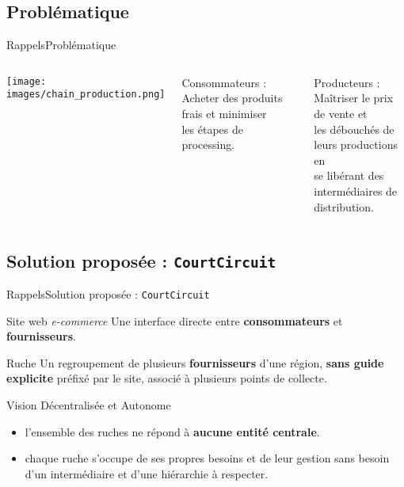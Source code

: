 \documentclass[usenames,dvipsnames]{beamer}
\begin{document}
\subsection{Problématique}
\begin{frame}{Rappels}{Problématique}
\begin{columns}[onlytextwidth, T]
  \column{50mm}
    \texttt{[image: images/chain\_production.png]}

  \column{\dimexpr\linewidth-35mm-4mm}
    \begin{block}{Consommateurs :}
    Acheter des produits frais et minimiser \\les étapes de processing.
    \end{block}

    \begin{block}{Producteurs :}
    Maîtriser le prix de vente et \\les débouchés de leurs productions en \\se libérant des intermédiaires de distribution.
    \end{block}
\end{columns}
\end{frame}

\subsection{Solution proposée : \texttt{CourtCircuit}}
\begin{frame}{Rappels}{Solution proposée : \texttt{CourtCircuit}}
  \begin{block}{Site web \textit{e-commerce}}
  Une interface directe entre \textbf{consommateurs} et \textbf{fournisseurs}.
  \end{block}

  \begin{block}{Ruche}
  Un regroupement de plusieurs \textbf{fournisseurs} d'une région, \textbf{sans guide explicite} préfixé par le site, associé à plusieurs points de collecte.
  \end{block}

  \begin{block}{Vision Décentralisée et Autonome}
  \begin{itemize}
    \item l'ensemble des ruches ne répond à \textbf{aucune entité centrale}.
    \item chaque ruche s'occupe de ses propres besoins et de leur gestion sans besoin d'un intermédiaire et d'une hiérarchie à respecter.
  \end{itemize}
  \end{block}
\end{frame}
\end{document}
